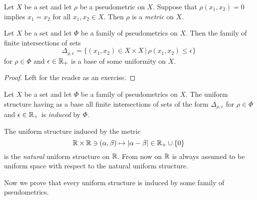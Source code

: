 \documentclass[10pt]{amsart}
\begin{document}
\begin{definition}
	Let $X$ be a set and let $\rho$ be a pseudometric on $X$. Suppose that $\rho(x_1,x_2) = 0$ implies $x_1 = x_2$ for all $x_1,x_2 \in X$. Then $\rho$ is a \textit{metric} on $X$.
\end{definition}

\begin{fact}\label{fact:uniform_structures_induced_by_families_of_pseudometrics}
	Let $X$ be a set and let $\Phi$ be a family of pseudometrics on $X$. Then the family of finite intersections of sets 
	$$\Delta_{\rho, \epsilon} = \big\{(x_1,x_2) \in X\times X\,\big|\,\rho(x_1, x_2) \leq \epsilon \big\}$$
for $\rho \in \Phi$ and $\epsilon \in {\mathbb R}_+$ is a base of some uniformity on $X$.
\end{fact}
\begin{proof}
	Left for the reader as an exercise.
\end{proof}

\begin{definition}
	Let $X$ be a set and let $\Phi$ be a family of pseudometrics on $X$. The uniform structure having as a base all finite intersections of sets of the form $\Delta_{\rho, \epsilon}$ for $\rho \in \Phi$ and $\epsilon \in {\mathbb R}_+$ is \textit{induced} by $\Phi$.
\end{definition}

\begin{example}\label{example:natural_uniform_structure_on_reals}
	The uniform structure induced by the metric
	$${\mathbb R}\times {\mathbb R} \ni (\alpha, \beta) \mapsto |\alpha - \beta| \in {\mathbb R}_+\cup \{0\}$$
	is the \textit{natural} uniform structure on ${\mathbb R}$. From now on ${\mathbb R}$ is always assumed to be uniform space with respect to the natural uniform structure.
\end{example}
\noindent
Now we prove that every uniform structure is induced by some family of pseudometrics.
\end{document}
